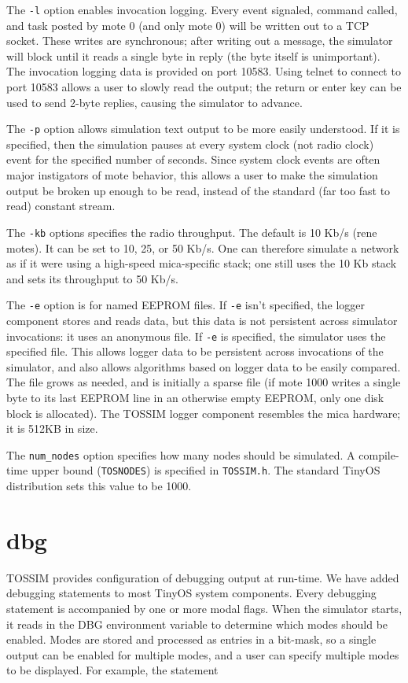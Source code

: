 \documentclass[12pt]{article}
\begin{document}
The {\tt -l} option enables invocation logging. Every event signaled,
command called, and task posted by mote 0 (and only mote 0) will be
written out to a TCP socket. These writes are synchronous; after
writing out a message, the simulator will block until it reads a
single byte in reply (the byte itself is unimportant). The invocation
logging data is provided on port 10583. Using telnet to connect to
port 10583 allows a user to slowly read the output; the return or
enter key can be used to send 2-byte replies, causing the simulator to
advance.

The {\tt -p} option allows simulation text output to be more easily
understood. If it is specified, then the simulation pauses at every
system clock (not radio clock) event for the specified number of
seconds. Since system clock events are often major instigators of mote
behavior, this allows a user to make the simulation output be broken
up enough to be read, instead of the standard (far too fast to read)
constant stream.

The {\tt -kb} options specifies the radio throughput. The default is
10 Kb/s (rene motes). It can be set to 10, 25, or 50 Kb/s. One can
therefore simulate a network as if it were using a high-speed
mica-specific stack; one still uses the 10 Kb stack and sets its
throughput to 50 Kb/s.

The {\tt -e} option is for named EEPROM files. If {\tt -e} isn't
specified, the logger component stores and reads data, but this data
is not persistent across simulator invocations: it uses an anonymous
file. If {\tt -e} is specified, the simulator uses the specified
file. This allows logger data to be persistent across invocations of
the simulator, and also allows algorithms based on logger data to be
easily compared. The file grows as needed, and is initially a sparse
file (if mote 1000 writes a single byte to its last EEPROM line in an
otherwise empty EEPROM, only one disk block is allocated). The TOSSIM
logger component resembles the mica hardware; it is 512KB in size.

The {\tt num\_nodes} option specifies how many nodes should be
simulated. A compile-time upper bound ({\tt TOSNODES}) is specified in
{\tt TOSSIM.h}. The standard TinyOS distribution sets this value to be
1000.

\section*{dbg}

TOSSIM provides configuration of debugging output at run-time. We have
added debugging statements to most TinyOS system components. Every
debugging statement is accompanied by one or more modal flags. When
the simulator starts, it reads in the DBG environment variable to determine
which modes should be enabled. Modes are stored and processed as
entries in a bit-mask, so a single output can be enabled for multiple
modes, and a user can specify multiple modes to be displayed. For
example, the statement
\end{document}
